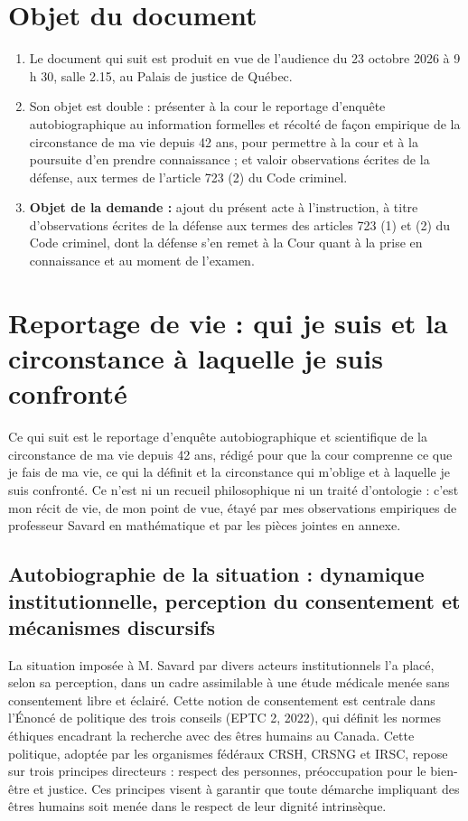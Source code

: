 \documentclass[12pt,letterpaper,oneside]{article}
\begin{document}
\section{Objet du document}
\begin{enumerate}[label=\arabic*.,leftmargin=*,itemsep=0pt,topsep=0pt]
\item Le document qui suit est produit en vue de l'audience du 23 octobre 2026 à 9 h 30, salle 2.15, au Palais de justice de Québec.

\item Son objet est double : présenter à la cour le reportage d'enquête autobiographique au information formelles et récolté de façon empirique de la circonstance de ma vie depuis 42 ans, pour permettre à la cour et à la poursuite d'en prendre connaissance ; et valoir observations écrites de la défense, aux termes de l'article 723 (2) du Code criminel.

\item \textbf{Objet de la demande :} ajout du présent acte à l'instruction, à titre d'observations écrites de la défense aux termes des articles 723 (1) et (2) du Code criminel, dont la défense s'en remet à la Cour quant à la prise en connaissance et au moment de l'examen.
\end{enumerate}

\section{Reportage de vie : qui je suis et la circonstance à laquelle je suis confronté}
Ce qui suit est le reportage d'enquête autobiographique et scientifique de la circonstance de ma vie depuis 42 ans, rédigé pour que la cour comprenne ce que je fais de ma vie, ce qui la définit et la circonstance qui m'oblige et à laquelle je suis confronté. Ce n'est ni un recueil philosophique ni un traité d'ontologie : c'est mon récit de vie, de mon point de vue, étayé par mes observations empiriques de professeur Savard en mathématique et par les pièces jointes en annexe.

\subsection*{Autobiographie de la situation : dynamique institutionnelle, perception du consentement et mécanismes discursifs}
La situation imposée à M. Savard par divers acteurs institutionnels l’a placé, selon sa perception, dans un cadre assimilable à une étude médicale menée sans consentement libre et éclairé. Cette notion de consentement est centrale dans l’Énoncé de politique des trois conseils (EPTC 2, 2022), qui définit les normes éthiques encadrant la recherche avec des êtres humains au Canada. Cette politique, adoptée par les organismes fédéraux CRSH, CRSNG et IRSC, repose sur trois principes directeurs : respect des personnes, préoccupation pour le bien-être et justice. Ces principes visent à garantir que toute démarche impliquant des êtres humains soit menée dans le respect de leur dignité intrinsèque.
\end{document}
